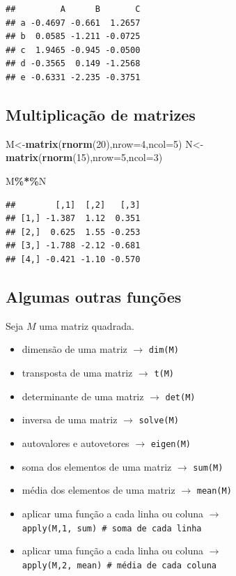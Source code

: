 \documentclass[
]{book}
\newenvironment{Shaded}{\begin{snugshade}}{\end{snugshade}}
\newcommand{\AttributeTok}[1]{\textcolor[rgb]{0.13,0.29,0.53}{#1}}
\newcommand{\DecValTok}[1]{\textcolor[rgb]{0.00,0.00,0.81}{#1}}
\newcommand{\FunctionTok}[1]{\textcolor[rgb]{0.13,0.29,0.53}{\textbf{#1}}}
\newcommand{\NormalTok}[1]{#1}
\newcommand{\OtherTok}[1]{\textcolor[rgb]{0.56,0.35,0.01}{#1}}
\newcommand{\SpecialCharTok}[1]{\textcolor[rgb]{0.81,0.36,0.00}{\textbf{#1}}}
\begin{document}
\begin{verbatim}
##         A      B       C
## a -0.4697 -0.661  1.2657
## b  0.0585 -1.211 -0.0725
## c  1.9465 -0.945 -0.0500
## d -0.3565  0.149 -1.2568
## e -0.6331 -2.235 -0.3751
\end{verbatim}

\subsection{Multiplicação de matrizes}\label{multiplicauxe7uxe3o-de-matrizes}

\begin{Shaded}
\begin{Highlighting}[]
\NormalTok{M}\OtherTok{\textless{}{-}}\FunctionTok{matrix}\NormalTok{(}\FunctionTok{rnorm}\NormalTok{(}\DecValTok{20}\NormalTok{),}\AttributeTok{nrow=}\DecValTok{4}\NormalTok{,}\AttributeTok{ncol=}\DecValTok{5}\NormalTok{)}
\NormalTok{N}\OtherTok{\textless{}{-}}\FunctionTok{matrix}\NormalTok{(}\FunctionTok{rnorm}\NormalTok{(}\DecValTok{15}\NormalTok{),}\AttributeTok{nrow=}\DecValTok{5}\NormalTok{,}\AttributeTok{ncol=}\DecValTok{3}\NormalTok{)}

\NormalTok{M}\SpecialCharTok{\%*\%}\NormalTok{N}
\end{Highlighting}
\end{Shaded}

\begin{verbatim}
##        [,1]  [,2]   [,3]
## [1,] -1.387  1.12  0.351
## [2,]  0.625  1.55 -0.253
## [3,] -1.788 -2.12 -0.681
## [4,] -0.421 -1.10 -0.570
\end{verbatim}

\subsection{Algumas outras funções}\label{algumas-outras-funuxe7uxf5es}

Seja \(M\) uma matriz quadrada.

\begin{itemize}
\item
  dimensão de uma matriz \(\to\) \texttt{dim(M)}
\item
  transposta de uma matriz \(\to\) \texttt{t(M)}
\item
  determinante de uma matriz \(\to\) \texttt{det(M)}
\item
  inversa de uma matriz \(\to\) \texttt{solve(M)}
\item
  autovalores e autovetores \(\to\) \texttt{eigen(M)}
\item
  soma dos elementos de uma matriz \(\to\) \texttt{sum(M)}
\item
  média dos elementos de uma matriz \(\to\) \texttt{mean(M)}
\item
  aplicar uma função a cada linha ou coluna \(\to\) \texttt{apply(M,1,\ sum)\ \#\ soma\ de\ cada\ linha}
\item
  aplicar uma função a cada linha ou coluna \(\to\) \texttt{apply(M,2,\ mean)\ \#\ média\ de\ cada\ coluna}
\end{itemize}
\end{document}
